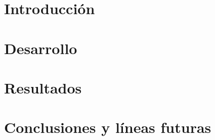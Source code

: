 \documentclass[spanish,a4paper,14pt,oneside]{extreport}
\begin{document}
\renewcommand{\thepage}{\roman{page}}
\setcounter{page}{1}


\tableofcontents

\newpage{\pagestyle{empty}}

\listoffigures

\newpage{\pagestyle{empty}}

\listoftables

\newpage{\pagestyle{empty}}

\renewcommand{\thepage}{\arabic{page}}
\setcounter{page}{1}


\chapter{Introducción}
\label{chapter:intro}




\chapter{Desarrollo}
\label{chapter:dos}



\newpage{\pagestyle{empty}}
\thispagestyle{empty}

\chapter{Resultados}
\label{chapter:tres}



\newpage{\pagestyle{empty}}
\thispagestyle{empty}

\chapter{Conclusiones y líneas futuras}
\label{chapter:Conclusiones}
\end{document}
